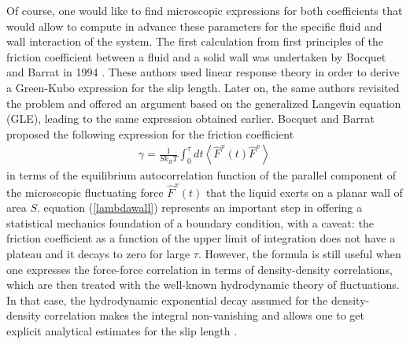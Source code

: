\documentclass[b5paper,openright,10pt]{book}
\newcommand{\llangle}{\left\langle}
\newcommand{\rrangle}{\right\rangle}
\begin{document}
Of course,  one would  like to find  microscopic expressions  for both
coefficients that would  allow to compute in  advance these parameters
for the specific fluid and wall  interaction of the system.  The first
calculation from first principles  of the friction coefficient between
a fluid and a solid wall was  undertaken by Bocquet and Barrat in 1994
\cite{Bocquet1994}. These  authors used
linear  response  theory   in   order  to  derive  a  Green-Kubo
expression  for the  slip length.   Later  on, the  same authors  
revisited the problem and offered an argument based on the generalized
Langevin  equation  (GLE), leading  to  the  same expression  obtained
earlier\cite{Bocquet2013}.  Bocquet and Barrat proposed the following  expression for
the friction coefficient
\begin{align}
  \gamma=\frac{1}{Sk_BT}\int_0^{\tau} dt \llangle \hat{F}^x(t)\hat{F}^x\rrangle
\label{lambdawall}
\end{align}
in terms of  the equilibrium autocorrelation function  of the parallel
component of the microscopic fluctuating force $\hat{F}^x(t)$ that the
liquid exerts on  a planar wall of area  $S$.  equation  (\ref{lambdawall})
represents  an  important step  in  offering  a statistical  mechanics
foundation  of  a boundary  condition,  with  a caveat:  the  friction
coefficient as a  function of the upper limit of  integration does not
have a plateau  and it decays to zero for  large $\tau$. 
However, the
formula is still useful when one expresses the force-force correlation
in terms of density-density correlations,  which are then treated with
the well-known hydrodynamic theory of fluctuations.  In that case, the
hydrodynamic  exponential   decay  assumed  for   the  density-density
correlation makes  the integral  non-vanishing and  allows one  to get
explicit     analytical    estimates     for    the     slip    length
\cite{Barrat1999,Bocquet2007,Kobryn2008,Kobryn2011}.
\end{document}
